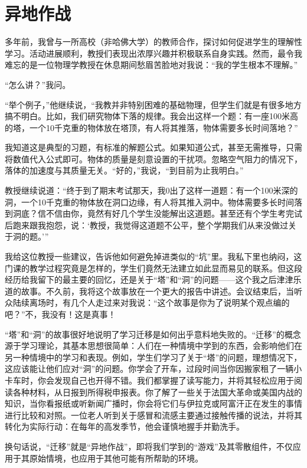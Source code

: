 
\chapter{异地作战}

多年前，我曾与一所高校（非哈佛大学）的教师合作，探讨如何促进学生的理解性学习。活动进展顺利，教授们表现出浓厚兴趣并积极联系自身实践。然而，最令我难忘的是一位物理学教授在休息期间愁眉苦脸地对我说：“我的学生根本不理解。”

“怎么讲？”我问。

“举个例子，”他继续说，“我教并非特别困难的基础物理，但学生们就是有很多地方搞不明白。比如，我们研究物体下落的规律。我会出这样一个题：有一座100米高的塔，一个10千克重的物体放在塔顶，有人将其推落，物体需要多长时间落地？”

我知道这是典型的习题，有标准的解题公式。如果知道公式，甚至无需推导，只需将数值代入公式即可。物体的质量是刻意设置的干扰项。忽略空气阻力的情况下，落体的加速度与其质量无关。“好的，”我说，“到目前为止我明白。”

教授继续说道：“终于到了期末考试那天，我0出了这样一道题：有一个100米深的洞，一个10千克重的物体放在洞口边缘，有人将其推入洞中。物体需要多长时间落到洞底？信不信由你，竟然有好几个学生没能解出这道题。甚至还有个学生考完试后跑来跟我抱怨，说：‘教授，我觉得这道题不公平，整个学期我们从来没做过关于洞的题。’”

我给这位教授一些建议，告诉他如何避免掉进类似的“坑”里。我私下里也纳闷，这门课的教学过程究竟是怎样的，学生们竟然无法建立如此显而易见的联系。但这段经历给我留下的最主要的回忆，还是关于“塔”和“洞”的问题——这个我之后津津乐道的故事。不久前，我将这个故事放在一个更大的报告中讲述。会议结束后，当听众陆续离场时，有几个人走过来对我说：“这个故事是你为了说明某个观点编的吧？”不，我没有！这是真事！

“塔”和“洞”的故事很好地说明了学习迁移是如何出乎意料地失败的。“迁移”的概念源于学习理论，其基本思想很简单：人们在一种情境中学到的东西，会影响他们在另一种情境中的学习和表现。例如，学生们学习了关于“塔”的问题，理想情况下，这应该能让他们应对“洞”的问题。你学会了开车，过段时间当你因搬家租了一辆小卡车时，你会发现自己也开得不错。我们都掌握了读写能力，并将其轻松应用于阅读各种材料，从日报到所得税申报表。你了解了一些关于法国大革命或美国内战的知识，当你看报纸或听新闻广播时，你会将它们与伊拉克或阿富汗正在发生的事情进行比较和对照。一位老人听到关于感冒和流感主要通过接触传播的说法，并将其转化为实际行动：在每年的高发季节，他会谨慎地握手并勤洗手。

换句话说，“迁移”就是“异地作战”，即将我们学到的“游戏”及其零散组件，不仅应用于其原始情境，也应用于其他可能有所帮助的环境。


